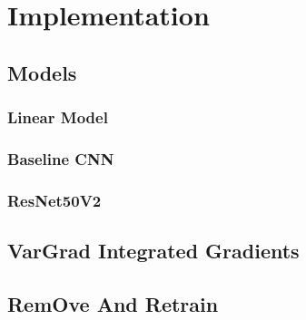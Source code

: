 \chapter{Implementation}
\label{ch:implementation}

\section{Models}
\label{sec:implementation:models}

\subsection{Linear Model}
\label{sec:implementation:lm}

\subsection{Baseline CNN}
\label{sec:implementation:BL_CNN}

\subsection{ResNet50V2}
\label{sec:implementation:RN50V2}


\section{VarGrad Integrated Gradients}
\label{sec:implementation:VarGrad_IG}


\section{RemOve And Retrain}
\label{sec:implementation:ROAR}

